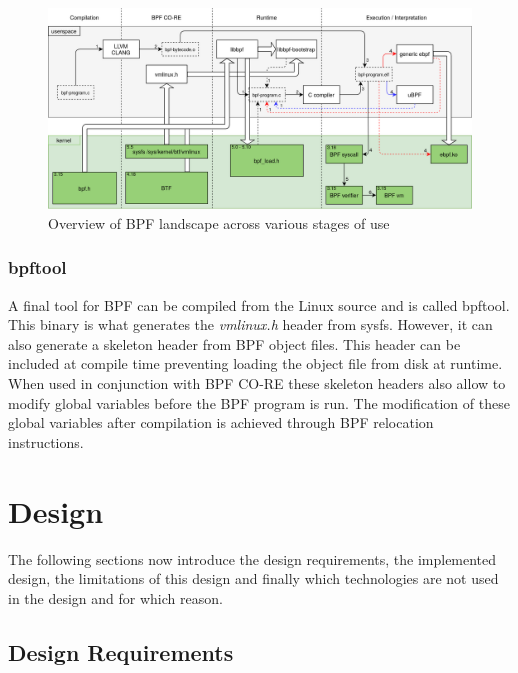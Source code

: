 \documentclass[conference]{IEEEtran}
\begin{document}
\begin{center}
	\begin{figure}[H]
		\includegraphics[width=1\textwidth]{resources/images/bpf-landscape.png}
		\captionsetup{justification=centering}
		\caption{Overview of BPF landscape across various stages of use}
		\label{fig:bpf-landscape}
	\end{figure}
\end{center}

\twocolumn

\subsubsection{bpftool}

A final tool for BPF can be compiled from the Linux source and is called
bpftool. This binary is what generates the \textit{vmlinux.h} header from
sysfs. However, it can also generate a skeleton header from BPF object files.
This header can be included at compile time preventing loading the object file
from disk at runtime. When used in conjunction with BPF CO-RE these skeleton
headers also allow to modify global variables before the BPF program is run.
The modification of these global variables after compilation is achieved through
BPF relocation instructions.

\section{Design} \label{design}

The following sections now introduce the design requirements, the implemented
design, the limitations of this design and finally which technologies are not
used in the design and for which reason.

\subsection{Design Requirements}
\end{document}
